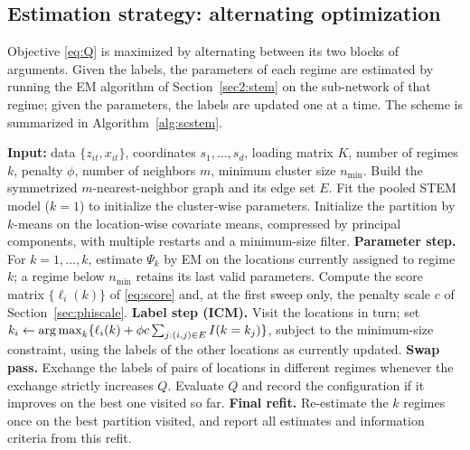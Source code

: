 \subsection{Estimation strategy: alternating optimization}\label{sec2:algo}

Objective \eqref{eq:Q} is maximized by alternating between its two blocks of arguments. Given the labels, the parameters of each regime are estimated by running the EM algorithm of Section~\ref{sec2:stem} on the sub-network of that regime; given the parameters, the labels are updated one at a time. The scheme is summarized in Algorithm~\ref{alg:scstem}.

\begin{algorithm}[t]
\caption{Estimation of the SC-STEM model at fixed $k$ and $\phi$}\label{alg:scstem}
\begin{algorithmic}[1]
  \State \textbf{Input:} data $\{z_{it}, x_{it}\}$, coordinates $s_1,\ldots,s_d$, loading matrix $K$, number of regimes $k$, penalty $\phi$, number of neighbors $m$, minimum cluster size $n_{\min}$.
  \State Build the symmetrized $m$-nearest-neighbor graph and its edge set $E$.
  \State Fit the pooled STEM model ($k=1$) to initialize the cluster-wise parameters.
  \State Initialize the partition by $k$-means on the location-wise covariate means, compressed by principal components, with multiple restarts and a minimum-size filter.
  \Repeat
    \State \textbf{Parameter step.} For $k=1,\ldots,k$, estimate $\Psi_k$ by EM on the locations currently assigned to regime $k$; a regime below $n_{\min}$ retains its last valid parameters.
    \State Compute the score matrix $\{\ell_i(k)\}$ of \eqref{eq:score} and, at the first sweep only, the penalty scale $c$ of Section~\ref{sec:phiscale}.
    \State \textbf{Label step (ICM).} Visit the locations in turn; set $k_i \leftarrow \operatorname*{arg\,max}_{k} \{\ell_i(k) + \phi c \sum_{j:(i,j) \in E} I(k = k_j)\}$, subject to the minimum-size constraint, using the labels of the other locations as currently updated.
    \State \textbf{Swap pass.} Exchange the labels of pairs of locations in different regimes whenever the exchange strictly increases $Q$.
    \State Evaluate $Q$ and record the configuration if it improves on the best one visited so far.
  \State \textbf{Final refit.} Re-estimate the $k$ regimes once on the best partition visited, and report all estimates and information criteria from this refit.
\end{algorithmic}
\end{algorithm}

